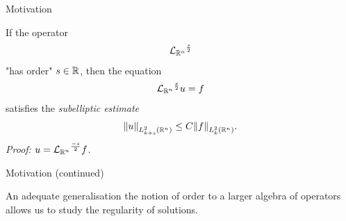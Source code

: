 \documentclass{beamer}
\begin{document}
\begin{frame}
    {Motivation}

    If the operator
    \begin{align*}
        {\Laplacian [\R^n]}^\frac s 2
    \end{align*}
    "has order" $s \in \R$,
    \pause
    then the equation
    \begin{align*}
        {\Laplacian [\R^n]}^\frac s 2 u = f
    \end{align*}
    satisfies the \emph{subelliptic estimate}
    \begin{align*}
        \norm [\Sobolev {k + s}] u
        \leq C \norm [\Sobolev k] f.
    \end{align*}
    \pause
    \emph{Proof:} $u = {\Laplacian [\R^n]}^\frac {-s} 2 f$.
\end{frame}

\begin{frame}
    {Motivation (continued)}

    An adequate generalisation the notion of order to a larger algebra of operators allows us to study the regularity of solutions.
\end{frame}
\end{document}
